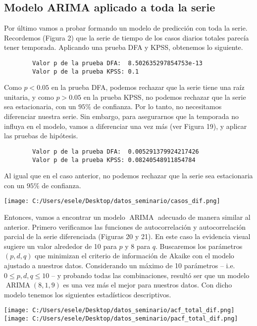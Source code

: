 \documentclass[11pt,letterpaper]{article}
\newcommand{\ARIMA}{\ensuremath{\operatorname{ARIMA}}}
\theoremstyle{definition}
\theoremstyle{theorem}
\theoremstyle{remark}
\begin{document}
	\subsection{Modelo ARIMA aplicado a toda la serie}
	\noindent Por último vamos a probar formando un modelo de predicción con toda la serie. Recordemos (Figura 2) que la serie de tiempo de los casos diarios totales parecía tener temporada. Aplicando una prueba DFA y KPSS, obtenemos lo siguiente.
	\begin{verbatim}
		Valor p de la prueba DFA:  8.502635297854753e-13
		Valor p de la prueba KPSS: 0.1\end{verbatim}\par
	Como \(p<0.05\) en la prueba DFA, podemos rechazar que la serie tiene una raíz unitaria, y como \(p>0.05\) en la prueba KPSS, no podemos rechazar que la serie sea estacionaria, con un \(95\%\) de confianza. Por lo tanto, no necesitamos diferenciar nuestra serie. Sin embargo, para asegurarnos que la temporada no influya en el modelo, vamos a diferenciar una vez más (ver Figura 19), y aplicar las pruebas de hipótesis.
	\begin{verbatim}
		Valor p de la prueba DFA:  0.005291379924217426
		Valor p de la prueba KPSS: 0.08240548911854784\end{verbatim}
	Al igual que en el caso anterior, no podemos rechazar que la serie sea estacionaria con un \(95\%\) de confianza.
	\begin{center}
		\texttt{[image: C:/Users/esele/Desktop/datos\_seminario/casos\_dif.png]}
	\end{center}
	\par Entonces, vamos a encontrar un modelo \(\ARIMA\) adecuado de manera similar al anterior. Primero verificamos las funciones de autocorrelación y autocorrelación parcial de la serie diferenciada (Figuras 20 y 21). En este caso la evidencia visual sugiere un valor alrededor de 10 para \(p\) y 8 para \(q\). Buscaremos los parámetros \((p,d,q)\) que minimizan el criterio de información de Akaike con el modelo ajustado a nuestros datos. Considerando un máximo de 10 parámetros -- i.e. \(0\leq p,d,q\leq10\) -- y probando todas las combinaciones, resultó ser que un modelo \(\ARIMA(8,1,9)\) es una vez más el mejor para nuestros datos. Con dicho modelo tenemos los siguientes estadísticos descriptivos.
	\begin{center}
		\texttt{[image: C:/Users/esele/Desktop/datos\_seminario/acf\_total\_dif.png]}
		\texttt{[image: C:/Users/esele/Desktop/datos\_seminario/pacf\_total\_dif.png]}
	\end{center}
\end{document}
